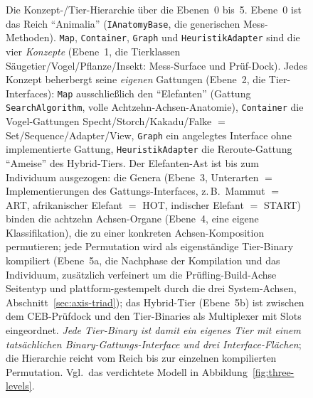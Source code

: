 \begin{nurlang}
\begin{figure}[htbp]
\caption[Die vier Konzepte und die Tier-Hierarchie bis zum kompilierten Binary]{Die Konzept-/Tier-Hierarchie über die Ebenen~0 bis~5. Ebene~0 ist das Reich \enquote{Animalia} (\texttt{IAnatomyBase}, die generischen Mess-Methoden). \texttt{Map}, \texttt{Container}, \texttt{Graph} und \texttt{HeuristikAdapter} sind die vier \emph{Konzepte} (Ebene~1, die Tierklassen Säugetier/Vogel/Pflanze/Insekt: Mess-Surface und Prüf-Dock). Jedes Konzept beherbergt seine \emph{eigenen} Gattungen (Ebene~2, die Tier-Interfaces): \texttt{Map} ausschließlich den \enquote{Elefanten} (Gattung \texttt{SearchAlgorithm}, volle Achtzehn-Achsen-Anatomie), \texttt{Container} die Vogel-Gattungen Specht/Storch/Kakadu/Falke $=$ Set/Sequence/Adapter/View, \texttt{Graph} ein angelegtes Interface ohne implementierte Gattung, \texttt{HeuristikAdapter} die Reroute-Gattung \enquote{Ameise} des Hybrid-Tiers. Der Elefanten-Ast ist bis zum Individuum ausgezogen: die Genera (Ebene~3, Unterarten $=$ Implementierungen des Gattungs-Interfaces, z.\,B.\ Mammut $=$ ART, afrikanischer Elefant $=$ HOT, indischer Elefant $=$ START) binden die achtzehn Achsen-Organe (Ebene~4, eine eigene Klassifikation), die zu einer konkreten Achsen-Komposition permutieren; jede Permutation wird als eigenständige Tier-Binary kompiliert (Ebene~5a, die Nachphase der Kompilation und das Individuum, zusätzlich verfeinert um die Prüfling-Build-Achse Seitentyp und plattform-gestempelt durch die drei System-Achsen, Abschnitt~\ref{sec:axis-triad}); das Hybrid-Tier (Ebene~5b) ist zwischen dem CEB-Prüfdock und den Tier-Binaries als Multiplexer mit Slots eingeordnet\@. \emph{Jede Tier-Binary ist damit ein eigenes Tier mit einem tatsächlichen Binary-Gattungs-Interface und drei Interface-Flächen}; die Hierarchie reicht vom Reich bis zur einzelnen kompilierten Permutation. Vgl.\ das verdichtete Modell in Abbildung~\ref{fig:three-levels}.}\label{fig:genera}
\end{figure}
\end{nurlang}
